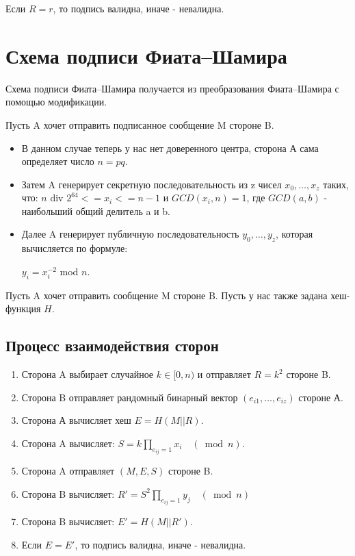 \documentclass[colorthm]{./civarticle}
\begin{document}
Если $R = r$, то подпись валидна, иначе - невалидна.

\section{Схема подписи Фиата–Шамира}
Схема подписи Фиата–Шамира получается из преобразования Фиата–Шамира с помощью модификации. 

Пусть A хочет отправить подписанное сообщение M стороне B. 

\begin{itemize}
    \item В данном случае теперь у нас нет доверенного центра, сторона А сама определяет число $n=pq$.
    \item Затем A генерирует секретную последовательность из z чисел $x_0, \ldots, x_z$ таких, что: $n $ div $ 2^{64} <=x_i<= n-1$ и $GCD(x_i, n) = 1$, где $GCD(a, b)$ - наибольший общий делитель a и b.
    \item Далее A генерирует публичную последовательность $y_0, \ldots, y_z$, которая вычисляется по формуле:

    $y_i = x^{-2}_i$ mod $n$.
\end{itemize}

Пусть A хочет отправить сообщение M стороне B. Пусть у нас также задана хеш-функция $H$.

\subsection{Процесс взаимодействия сторон}

\begin{enumerate}
    \item Сторона A выбирает случайное $k \in [0, n)$ и отправляет $R=k^{2}$ стороне B. 
    \item Сторона B отправляет рандомный бинарный вектор $(e_{i1}, \ldots, e_{iz})$ стороне А.
    \item Сторона А вычисляет хеш $E=H(M||R)$.
    \item Сторона A вычисляет: $S=k \prod_{e_{ij}=1} x_i \quad(\bmod n)$.
    \item Сторона A отправляет $(M, E, S)$ стороне B.
    \item Сторона B вычисляет: $R' = S^{2} \prod_{e_{ij}=1} y_j \quad(\bmod n)$
    \item Сторона B вычисляет: $E'=H(M||R')$.
    \item Если $E=E'$, то подпись валидна, иначе - невалидна.
\end{enumerate}
\end{document}
